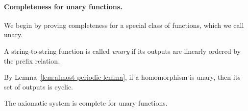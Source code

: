 \paragraph*{Completeness for unary functions.} We begin by proving completeness for a special class of functions, which we call unary.
\begin{definition}
    A string-to-string function is called \emph{unary} if its outputs are linearly ordered by the prefix relation.
\end{definition}
By Lemma~\ref{lem:almost-periodic-lemma}, if a homomorphism is unary, then its set of outputs is cyclic.

\begin{lemma}\label{lem:completeness-for-when-outputs-are-prefixes}
    The axiomatic system is complete for unary functions.
\end{lemma} 
